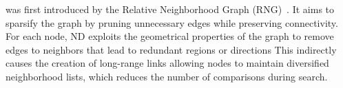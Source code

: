  was first introduced by the Relative Neighborhood Graph (RNG)~\cite{rng}. It aims to sparsify the graph by pruning unnecessary edges while preserving connectivity. For each node, ND exploits the geometrical properties of the graph to remove edges to neighbors that lead to redundant regions or directions
This indirectly causes the creation of long-range links allowing nodes to maintain diversified neighborhood lists, which reduces the number of comparisons during search.

